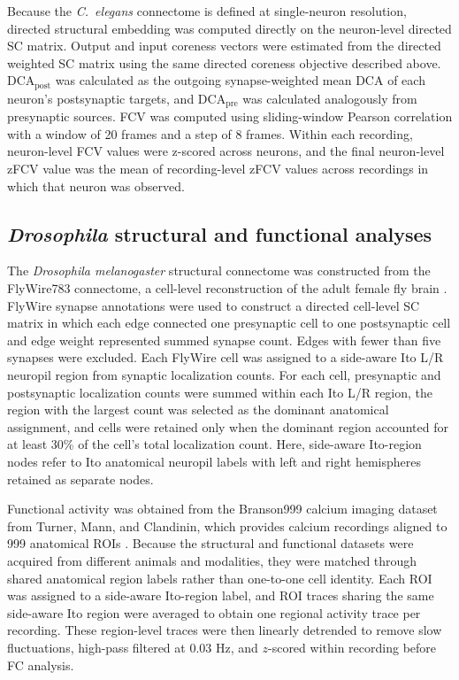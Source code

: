\documentclass[9pt,twocolumn,twoside]{pnas-new}
\begin{document}
{Because the \textit{C.~elegans} connectome is defined at single-neuron resolution, directed structural embedding was computed directly on the neuron-level directed SC matrix. Output and input coreness vectors were estimated from the directed weighted SC matrix using the same directed coreness objective described above. $\mathrm{DCA}_{\mathrm{post}}$ was calculated as the outgoing synapse-weighted mean DCA of each neuron's postsynaptic targets, and $\mathrm{DCA}_{\mathrm{pre}}$ was calculated analogously from presynaptic sources. FCV was computed using sliding-window Pearson correlation with a window of 20 frames and a step of 8 frames. Within each recording, neuron-level FCV values were z-scored across neurons, and the final neuron-level zFCV value was the mean of recording-level zFCV values across recordings in which that neuron was observed.


\subsection*{\textit{Drosophila} structural and functional analyses}

The \textit{Drosophila melanogaster} structural connectome was constructed from the FlyWire783 connectome, a cell-level reconstruction of the adult female fly brain \citep{Dorkenwald2024FlyWire}. FlyWire synapse annotations were used to construct a directed cell-level SC matrix in which each edge connected one presynaptic cell to one postsynaptic cell and edge weight represented summed synapse count. Edges with fewer than five synapses were excluded. Each FlyWire cell was assigned to a side-aware Ito L/R neuropil region from synaptic localization counts. For each cell, presynaptic and postsynaptic localization counts were summed within each Ito L/R region, the region with the largest count was selected as the dominant anatomical assignment, and cells were retained only when the dominant region accounted for at least 30\% of the cell's total localization count. Here, side-aware Ito-region nodes refer to Ito anatomical neuropil labels with left and right hemispheres retained as separate nodes.

Functional activity was obtained from the Branson999 calcium imaging dataset from Turner, Mann, and Clandinin, which provides calcium recordings aligned to 999 anatomical ROIs \citep{Turner2021Branson999,Turner2021DrosophilaCentralBrainConnectivity}. Because the structural and functional datasets were acquired from different animals and modalities, they were matched through shared anatomical region labels rather than one-to-one cell identity. Each ROI was assigned to a side-aware Ito-region label\citep{Ito2014InsectBrainNomenclature}, and ROI traces sharing the same side-aware Ito region were averaged to obtain one regional activity trace per recording. These region-level traces were then linearly detrended to remove slow fluctuations, high-pass filtered at 0.03 Hz, and $z$-scored within recording before FC analysis.

}
\end{document}
